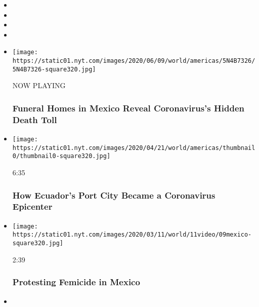 \begin{itemize}
\item
\item
\item
\item
\end{itemize}

\begin{itemize}
\item
  \texttt{[image: https://static01.nyt.com/images/2020/06/09/world/americas/5N4B7326/5N4B7326-square320.jpg]}

  NOW PLAYING

  \hypertarget{funeral-homes-in-mexico-reveal-coronaviruss-hidden-death-toll-2}{%
  \subsubsection{Funeral Homes in Mexico Reveal Coronavirus's Hidden
  Death
  Toll}\label{funeral-homes-in-mexico-reveal-coronaviruss-hidden-death-toll-2}}
\item
  \href{https://www.nytimes.com/video/world/americas/100000007082011/coronavirus-deaths-ecuador-covid-19.html?action=click\&module=video-series-bar\&region=header\&pgtype=Article\&playlistId=video/on-the-ground}{}

  \texttt{[image: https://static01.nyt.com/images/2020/04/21/world/americas/thumbnail0/thumbnail0-square320.jpg]}

  6:35

  \hypertarget{how-ecuadors-port-city-became-a-coronavirus-epicenter}{%
  \subsubsection{How Ecuador's Port City Became a Coronavirus
  Epicenter}\label{how-ecuadors-port-city-became-a-coronavirus-epicenter}}
\item
  \href{https://www.nytimes.com/video/world/americas/100000007023396/march-femicide-women-mexico.html?action=click\&module=video-series-bar\&region=header\&pgtype=Article\&playlistId=video/on-the-ground}{}

  \texttt{[image: https://static01.nyt.com/images/2020/03/11/world/11video/09mexico-square320.jpg]}

  2:39

  \hypertarget{protesting-femicide-in-mexico}{%
  \subsubsection{Protesting Femicide in
  Mexico}\label{protesting-femicide-in-mexico}}
\item
  \href{https://www.nytimes.com/video/world/americas/100000006930887/migrant-caravan-mexico.html?action=click\&module=video-series-bar\&region=header\&pgtype=Article\&playlistId=video/on-the-ground}{}


\end{itemize}
